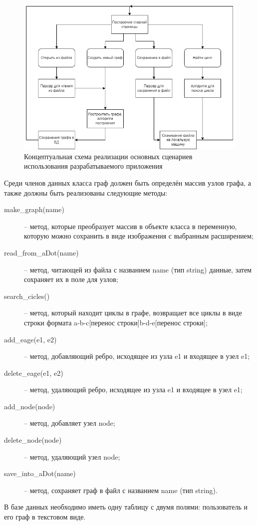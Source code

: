\begin{figure}[!ht]
    \centering
    \includegraphics[width=0.7\linewidth]{ResearchNotes/rndhpc_int_edt_2023_01_25/module.png}
    \caption{Концептуальная схема реализации основных сценариев использования разрабатываемого приложения}
    \label{fig:module}
\end{figure}

Среди членов данных класса граф должен быть определён массив узлов графа, а также должны быть реализованы следующие методы:
\begin{description}
\item[make_graph(name)] -- метод, которые преобразует массив в объекте класса в переменную, которую можно сохранить в виде изображения с выбранным расширением;
\item[read_from_aDot(name)] -- метод, читающей из файла с названием name (тип string) данные, затем сохраняет их в поле для узлов;
\item[search_cicles()] -- метод, который находит циклы в графе, возвращает все циклы в виде строки формата \textsf{a-b-c[перенос строки]b-d-e[перенос строки]};
\item[add_eage(e1, e2)] -- метод, добавляющий ребро, исходящее из узла \textsf{e1} и входящее в узел \textsf{e1};
\item[delete_eage(e1, e2)] -- метод, удаляющий ребро, исходящее из узла \textsf{e1} и входящее в узел \textsf{e1};
\item[add_node(node)] -- метод, добавляет узел node;
\item[delete_node(node)] -- метод, удаляющий узел node;
\item[save_into_aDot(name)] -- метод, сохраняет граф в файл с названием name (тип string).
\end{description}

В базе данных необходимо иметь одну таблицу с двумя полями: пользователь и его граф в текстовом виде.

\noteattributes{}
